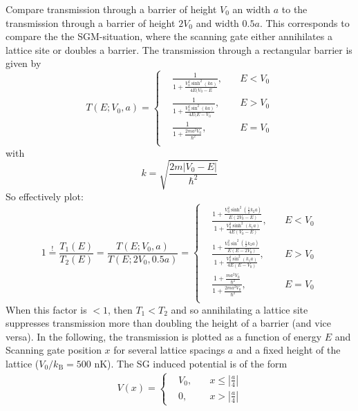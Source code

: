 \documentclass[11pt]{article}
\begin{document}
Compare transmission through a barrier of height $V_0$ an width $a$ to the transmission through a barrier of height $2V_0$ and width $0.5a$. This corresponds to compare the the SGM-situation, where the scanning gate either annihilates a lattice site or doubles a barrier.
The transmission through a rectangular barrier is given by
\begin{equation}
	T(E;V_0,a) = \left\{				
	\begin{aligned}
			& \frac{1}{1+\frac{V_0^2\sinh^2(k a)}{4E(V_0-E}}, \quad & E < V_0\\
			& \frac{1}{1+\frac{V_0^2\sin^2(k a)}{4E(E-V_0}}, & E > V_0 \\
			& \frac{1}{1+\frac{2ma^2V_0}{\hbar^2}}, & E = V_0\\
	\end{aligned}
	\right.
\label{eq:T_rectbarrier}
\end{equation}
with
\begin{equation}
		k = \sqrt{\frac{2m|V_0-E|}{\hbar^2}}
	\label{eq:k_vec}
\end{equation}
So effectively plot:
\begin{equation}	
  1 \overset{!}{=} \frac{T_1(E)}{T_2(E)} = \frac{T(E;V_0,a)}{T(E;2V_0,0.5a)} = \left\{				
	\begin{aligned}
			& \frac{1+\frac{V_0^2\sinh^2(\frac{1}{2}k_2 a)}{E(2V_0-E)}}{1+\frac{V_0^2\sinh^2(k_1 a)}{4E(V_0-E)}}, \quad & E < V_0\\
			& \frac{1+\frac{V_0^2\sin^2(\frac{1}{2}k_2 a)}{E(E-2V_0)}}{1+\frac{V_0^2\sin^2(k_1 a)}{4E(E-V_0)}}, & E > V_0 \\
			& \frac{1+\frac{ma^2 V_0}{\hbar^2}}{1+\frac{2ma^2V_0}{\hbar^2}}, & E = V_0\\
	\end{aligned}
	\right.
\label{eq:T1T2}
\end{equation}
When this factor is $<1$, then $T_1<T_2$ and so annihilating a lattice site suppresses transmission more than doubling the height of a barrier (and vice versa). In the following, the transmission is plotted as a function of energy $E$ and Scanning gate position $x$ for several lattice spacings $a$ and a fixed height of the lattice ($V_0 / k_{\mathrm{B}}=500$ nK). The SG induced potential is of the form
\begin{align}
	V(x) = \left\{
	\begin{aligned}
		& V_0,\quad & x \leq \left|\frac{a}{4}\right|\\
		& 0, \quad & x > \left|\frac{a}{4}\right|
	\end{aligned}
	\right.
\label{eq:sgm_pot}
\end{align}
\end{document}
